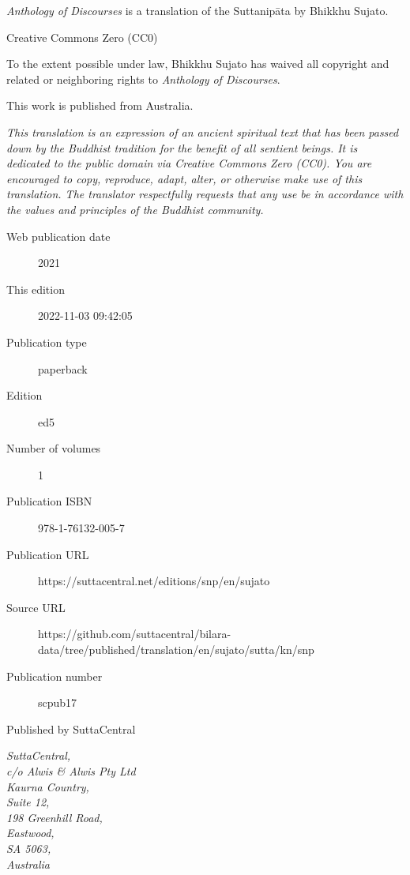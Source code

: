 \documentclass[12pt,openany]{book}%
\begin{document}
\begin{footnotesize}

\textit{Anthology of Discourses} is a translation of the Suttanipāta by Bhikkhu Sujato.

\medskip

Creative Commons Zero (CC0)

To the extent possible under law, Bhikkhu Sujato has waived all copyright and related or neighboring rights to \textit{Anthology of Discourses}.

\medskip

This work is published from Australia.

\begin{center}
\textit{This translation is an expression of an ancient spiritual text that has been passed down by the Buddhist tradition for the benefit of all sentient beings. It is dedicated to the public domain via Creative Commons Zero (CC0). You are encouraged to copy, reproduce, adapt, alter, or otherwise make use of this translation. The translator respectfully requests that any use be in accordance with the values and principles of the Buddhist community.}
\end{center}

\medskip

\begin{description}
    \item[Web publication date] 2021
    \item[This edition] 2022-11-03 09:42:05
    \item[Publication type] paperback
    \item[Edition] ed5
    \item[Number of volumes] 1
    \item[Publication ISBN] 978-1-76132-005-7
    \item[Publication URL] https://suttacentral.net/editions/snp/en/sujato
    \item[Source URL] https://github.com/suttacentral/bilara-data/tree/published/translation/en/sujato/sutta/kn/snp
    \item[Publication number] scpub17
\end{description}

\medskip

Published by SuttaCentral

\medskip

\textit{SuttaCentral,\\
c/o Alwis \& Alwis Pty Ltd\\
Kaurna Country,\\
Suite 12,\\
198 Greenhill Road,\\
Eastwood,\\
SA 5063,\\
Australia}

\end{footnotesize}
\end{document}
